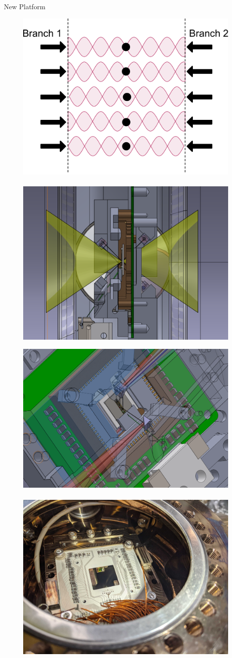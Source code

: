 \documentclass[final]{beamer}
\begin{document}
\begin{frame}{}
\begin{center}
\begin{columns}[t]
\begin{column}{0.49\textwidth}
\begin{alertblock}{New Platform}
      \begin{figure}
        \includegraphics[height=0.295\textwidth]{./figs/single_address.pdf}~~~
        \includegraphics[height=0.295\textwidth]{./figs/trap_NA.png}\vspace{1em}

        \includegraphics[height=0.28\textwidth]{./figs/solidworks_overview.png}~~~
        \includegraphics[height=0.28\textwidth]{./figs/mirror_photo.jpg}
      \end{figure}

    \end{alertblock}

  \end{column}
\end{columns}

\end{center}
\end{frame}
\end{document}

